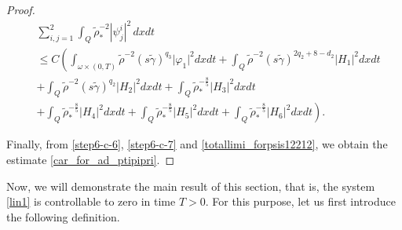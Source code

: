 \documentclass[11pt,a4paper]{amsart}
\numberwithin{equation}{section}
\begin{document}
\begin{proof}
 \begin{equation}\label{totallimi_forpsis12212}
\begin{split}
&\sum_{i,j=1}^{2}\int_{Q}\tilde{\rho}^{-2}_{*}|\psi^{i}_{j}|^{2}\,dxdt \\
&\leq C\left(\int_{\omega\times (0,T)}\tilde{\rho}^{-2}(s\tilde{\gamma})^{q_3}\vert \varphi_1 \vert^2dxdt +\int_{Q}\tilde{\rho}^{-2}(s\tilde{\gamma})^{2q_{2}+8-d_{2}}\vert H_1\vert^2dxdt \right.\\
&	  + \int_{Q}\tilde{\rho}^{-2}(s\tilde{\gamma})^{q_2}\vert H_2\vert^2dxdt +\int_{Q}\tilde{\rho}^{-\frac{8}{5}}_{*} \vert H_{3}\vert^2  dxdt\\
&\left. +\int_{Q}\tilde{\rho}^{-\frac{8}{5}}_{*}\vert H_{4}\vert^2  dxdt+\int_{Q}\tilde{\rho}^{-\frac{8}{5}}_{*} \vert H_{5}\vert^2  dxdt
    +\int_{Q}\tilde{\rho}^{-\frac{8}{5}}_{*} \vert H_{6}\vert^2  dxdt\right).
\end{split}
 \end{equation}

 Finally, from \eqref{step6-c-6}, \eqref{step6-c-7} and \eqref{totallimi_forpsis12212}, we obtain the estimate \eqref{car_for_ad_ptipipri}.

\end{proof}

Now, we will demonstrate the main result of this section, that is, the system \eqref{lin1} is controllable to zero in time $T>0$. For this purpose, let us first  introduce the following definition.
\end{document}

